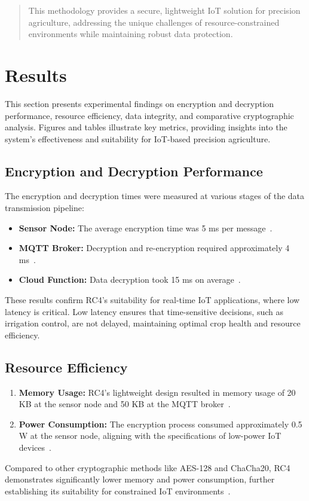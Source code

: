 \documentclass[journal]{Definitions/mdpi}
\begin{document}
\begin{quote}
This methodology provides a secure, lightweight IoT solution for precision agriculture, addressing the unique challenges of resource-constrained environments while maintaining robust data protection.
\end{quote}

\section{Results}

This section presents experimental findings on encryption and decryption performance, resource efficiency, data integrity, and comparative cryptographic analysis. Figures and tables illustrate key metrics, providing insights into the system's effectiveness and suitability for IoT-based precision agriculture.

\subsection{Encryption and Decryption Performance}

The encryption and decryption times were measured at various stages of the data transmission pipeline:
\begin{itemize}
    \item \textbf{Sensor Node:} The average encryption time was 5 ms per message~\cite{ref-mdpi4}.
    \item \textbf{MQTT Broker:} Decryption and re-encryption required approximately 4 ms~\cite{ref-mdpi5}.
    \item \textbf{Cloud Function:} Data decryption took 15 ms on average~\cite{ref-cloud1}.
\end{itemize}
These results confirm RC4's suitability for real-time IoT applications, where low latency is critical. Low latency ensures that time-sensitive decisions, such as irrigation control, are not delayed, maintaining optimal crop health and resource efficiency.

\subsection{Resource Efficiency}

\begin{enumerate}
    \item \textbf{Memory Usage:} RC4's lightweight design resulted in memory usage of 20 KB at the sensor node and 50 KB at the MQTT broker~\cite{ref-journal6}.
    \item \textbf{Power Consumption:} The encryption process consumed approximately 0.5 W at the sensor node, aligning with the specifications of low-power IoT devices~\cite{ref-mdpi2}.
\end{enumerate}
Compared to other cryptographic methods like AES-128 and ChaCha20, RC4 demonstrates significantly lower memory and power consumption, further establishing its suitability for constrained IoT environments~\cite{ref-mdpi4}.
\end{document}
